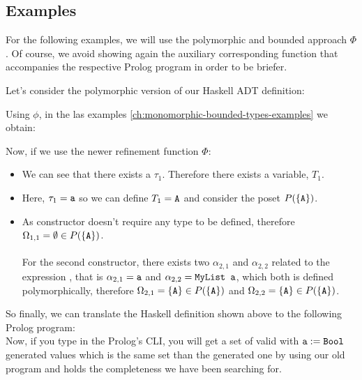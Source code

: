 	\subsection{Examples} \label{ch:polymorphic-types-examples}
	For the following examples, we will use the polymorphic and bounded approach $\Phi$. Of course, we avoid showing again the auxiliary corresponding function that accompanies the respective Prolog program in order to be briefer.
	\begin{example}[MyList]
		Let's consider the polymorphic version of our  Haskell ADT definition:
		
		Using $\phi$, in the las examples \ref{ch:monomorphic-bounded-types-examples} we obtain:
		
		Now, if we use the newer refinement function $\Phi$:
		\begin{itemize}
			\item We can see that there exists a $\tau_1$. Therefore there exists a variable, $T_1$.
			\item Here, $\tau_1 = \texttt{a}$ so we can define $T_1 = \texttt{A}$ and consider the poset $P(\{\texttt{A}\})$.
			\item As  constructor doesn't require any type to be defined, therefore $\Omega_{1,1} = \emptyset \in P(\{ \texttt{A} \})$. \\\\
			      For the second constructor, there exists two $\alpha_{2,1}$ and $\alpha_{2,2}$ related to the expression , that is $\alpha_{2,1} = \texttt{a}$ and $\alpha_{2,2} = \texttt{MyList a}$, which both is defined polymorphically, therefore $\Omega_{2,1} = \{\texttt{A}\} \in P(\{ \texttt{A} \})$ and $\Omega_{2,2} = \{\texttt{A}\} \in P(\{ \texttt{A} \})$.
		\end{itemize}
		So finally, we can translate the Haskell definition shown above to the following Prolog program:\\
		
		Now, if you type  in the Prolog's CLI, you will get a set of valid  with $\texttt{a} := \texttt{Bool}$ generated values which is the same set than the generated one by using our old  program and holds the completeness we have been searching for.\\
	\end{example}
